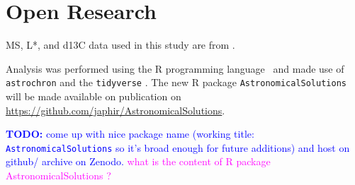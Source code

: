 \documentclass[draft]{agujournal2019}
\newcommand{\rez}{\textcolor{magenta}}
\newcommand{\ijk}{\textcolor{blue}}
\begin{document}


%
%

%

%



\section*{Open Research}

\Gls{MS}, \gls{L*}, and \gls{d13C} data used in this study are from .

Analysis was performed using the R programming language~\cite{RCoreTeam2024} and made use of \texttt{astrochron}  and the \texttt{tidyverse} .
The new R package \texttt{AstronomicalSolutions} will be made available on publication on \url{https://github.com/japhir/AstronomicalSolutions}.

\ijk{\textbf{TODO:} come up with nice package name (working title: \texttt{AstronomicalSolutions} so it's broad enough for future additions) and host on github/ archive on Zenodo.}
\rez{what is the content of R package AstronomicalSolutions ?}
\end{document}
